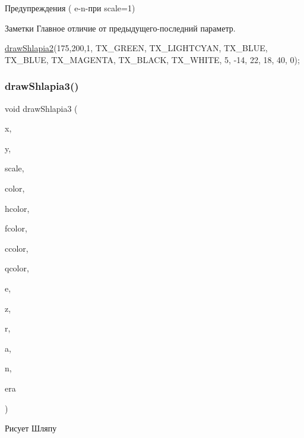 \begin{DoxyWarning}{Предупреждения}
( e-\/n-\/при scale=1) 
\end{DoxyWarning}
\begin{DoxyNote}{Заметки}
Главное отличие от предыдущего-\/последний параметр.  
\begin{DoxyCode}
\hyperlink{group___xD0_xA8_xD0_xBB_xD1_x8F_xD0_xBF_xD0_xB0_ga06dbb8364e388527ea7e24dde5900725}{drawShlapia2}(175,200,1, TX\_GREEN, TX\_LIGHTCYAN, TX\_BLUE, TX\_BLUE, TX\_MAGENTA, TX\_BLACK, 
      TX\_WHITE, 5, -14, 22, 18, 40, 0);
\end{DoxyCode}
 
\end{DoxyNote}
\hypertarget{group___xD0_xA8_xD0_xBB_xD1_x8F_xD0_xBF_xD0_xB0_ga19f574161defa3d320e3746940f4f99e}{}\label{group___xD0_xA8_xD0_xBB_xD1_x8F_xD0_xBF_xD0_xB0_ga19f574161defa3d320e3746940f4f99e} 
\subsubsection{\texorpdfstring{draw\+Shlapia3()}{drawShlapia3()}}
{\footnotesize\ttfamily void draw\+Shlapia3 (\begin{DoxyParamCaption}\item[{int}]{x,  }\item[{int}]{y,  }\item[{double}]{scale,  }\item[{C\+O\+L\+O\+R\+R\+EF}]{color,  }\item[{C\+O\+L\+O\+R\+R\+EF}]{hcolor,  }\item[{C\+O\+L\+O\+R\+R\+EF}]{fcolor,  }\item[{C\+O\+L\+O\+R\+R\+EF}]{ccolor,  }\item[{C\+O\+L\+O\+R\+R\+EF}]{qcolor,  }\item[{int}]{e,  }\item[{int}]{z,  }\item[{int}]{r,  }\item[{int}]{a,  }\item[{int}]{n,  }\item[{int}]{era }\end{DoxyParamCaption})}



Рисует Шляпу 


